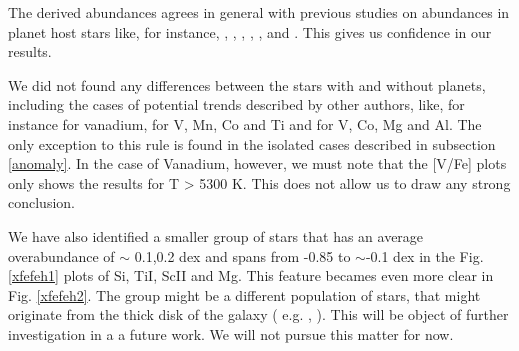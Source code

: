 \documentclass[dvips,12pt,a4paper]{report}
\begin{document}
{{The derived abundances agrees in general with previous studies on abundances in planet host stars like, for instance, \citet{Gonzalez-2001}, \citet{Takeda-2001},  \citet{Sadakane-2002}, \citet{Bodaghee-2003}, \citet{Beirao-2005}, \citet{Fischer-2005} and \citet{Gilli-2006}. This gives us confidence in our results. 


We did not found any differences between the stars with and without planets, including the cases of potential trends described by other authors, like, for instance \citet{Sadakane-2002} for vanadium, \citet{Bodaghee-2003} for V, Mn, Co and Ti and \citet{Gilli-2006} for V, Co, Mg and Al. The only exception to this rule is found in the isolated cases described in subsection \ref{anomaly}. In the case of Vanadium, however, we must note that the [V/Fe] plots only shows the results for T > 5300 K. This does not allow us to draw any strong conclusion.

We have also identified a smaller group of stars that has an average overabundance of $\sim$ 0.1,0.2 dex and spans from -0.85 to $\sim$-0.1 dex in the Fig. \ref{xfefeh1} plots of Si, TiI, ScII and Mg. This feature becames even more clear in Fig. \ref{xfefeh2}. The group might be a different population of stars, that might originate from the thick disk of the galaxy ( e.g. \citeauthor{Fuhrmann-2004} \citeyear{Fuhrmann-2004}, \citeauthor{Bensby-2003}\citeyear{Bensby-2003}). This will be object of further investigation in a a future work. We will not pursue this matter for now. 








}}
\end{document}
